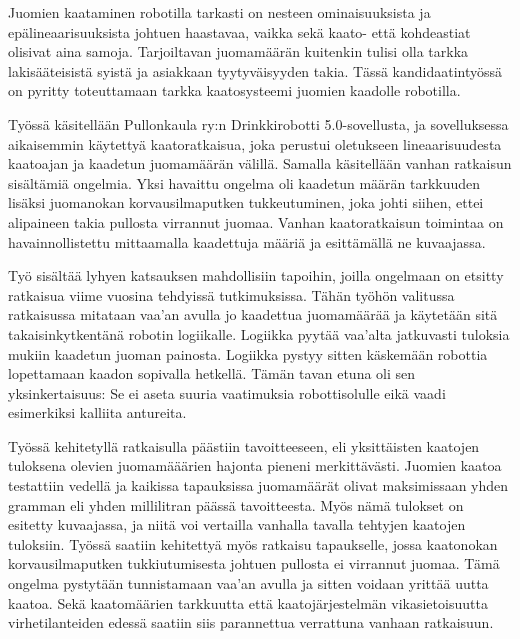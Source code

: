 Juomien kaataminen robotilla tarkasti on nesteen ominaisuuksista ja epälineaarisuuksista johtuen haastavaa, vaikka sekä kaato- että kohdeastiat olisivat aina samoja. Tarjoiltavan juomamäärän kuitenkin tulisi olla tarkka lakisääteisistä syistä ja asiakkaan tyytyväisyyden takia. Tässä kandidaatintyössä on pyritty toteuttamaan tarkka kaatosysteemi juomien kaadolle robotilla.

Työssä käsitellään Pullonkaula ry:n Drinkkirobotti 5.0\hyp{}sovellusta, ja sovelluksessa aikaisemmin käytettyä kaatoratkaisua, joka perustui oletukseen lineaarisuudesta kaatoajan ja kaadetun juomamäärän välillä. Samalla käsitellään vanhan ratkaisun sisältämiä ongelmia. Yksi havaittu ongelma oli kaadetun määrän tarkkuuden lisäksi juomanokan korvausilmaputken tukkeutuminen, joka johti siihen, ettei alipaineen takia pullosta virrannut juomaa. Vanhan kaatoratkaisun toimintaa on havainnollistettu mittaamalla kaadettuja määriä ja esittämällä ne kuvaajassa.

Työ sisältää lyhyen katsauksen mahdollisiin tapoihin, joilla ongelmaan on etsitty ratkaisua viime vuosina tehdyissä tutkimuksissa. Tähän työhön valitussa ratkaisussa mitataan vaa'an avulla jo kaadettua juomamäärää ja käytetään sitä takaisinkytkentänä robotin logiikalle. Logiikka pyytää vaa'alta jatkuvasti tuloksia mukiin kaadetun juoman painosta. Logiikka pystyy sitten käskemään robottia lopettamaan kaadon sopivalla hetkellä. Tämän tavan etuna oli sen yksinkertaisuus: Se ei aseta suuria vaatimuksia robottisolulle eikä vaadi esimerkiksi kalliita antureita.

Työssä kehitetyllä ratkaisulla päästiin tavoitteeseen, eli yksittäisten kaatojen tuloksena olevien juomamääärien hajonta pieneni merkittävästi. Juomien kaatoa testattiin vedellä ja kaikissa tapauksissa juomamäärät olivat maksimissaan yhden gramman eli yhden millilitran päässä tavoitteesta. Myös nämä tulokset on esitetty kuvaajassa, ja niitä voi vertailla vanhalla tavalla tehtyjen kaatojen tuloksiin. Työssä saatiin kehitettyä myös ratkaisu tapaukselle, jossa kaatonokan korvausilmaputken tukkiutumisesta johtuen pullosta ei virrannut juomaa. Tämä ongelma pystytään tunnistamaan vaa'an avulla ja sitten voidaan yrittää uutta kaatoa. Sekä kaatomäärien tarkkuutta että kaatojärjestelmän vikasietoisuutta virhetilanteiden edessä saatiin siis parannettua verrattuna vanhaan ratkaisuun.
